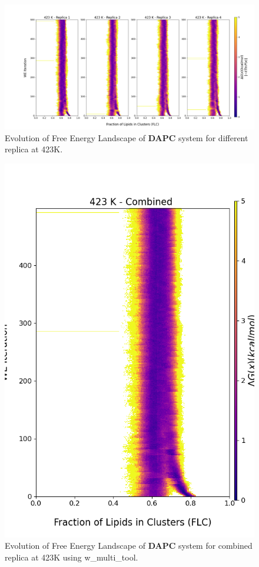 \documentclass{biophys-new}
\begin{document}
\begin{figure}[hbt!]
\centering
\includegraphics[width=1.1\linewidth]{all_plots/ClusterLipids2Total/DPPC_DAPC_CHOL/423K/Evolution_DAPC_423_ClusterLipids2Total.png}
\caption{Evolution of Free Energy Landscape of \textbf{DAPC} system for different replica at 423K.}
\label{fig:view}

\end{figure}

\begin{figure}[hbt!]
\centering
\includegraphics[width=0.8\linewidth]{all_plots/ClusterLipids2Total/DPPC_DAPC_CHOL/423K/Evolution_DAPC_MULTI__423_ClusterLipids2Total.png}
\caption{Evolution of Free Energy Landscape of \textbf{DAPC} system for combined replica at 423K using w\_multi\_tool.}
\label{fig:view}

\end{figure}
\end{document}

